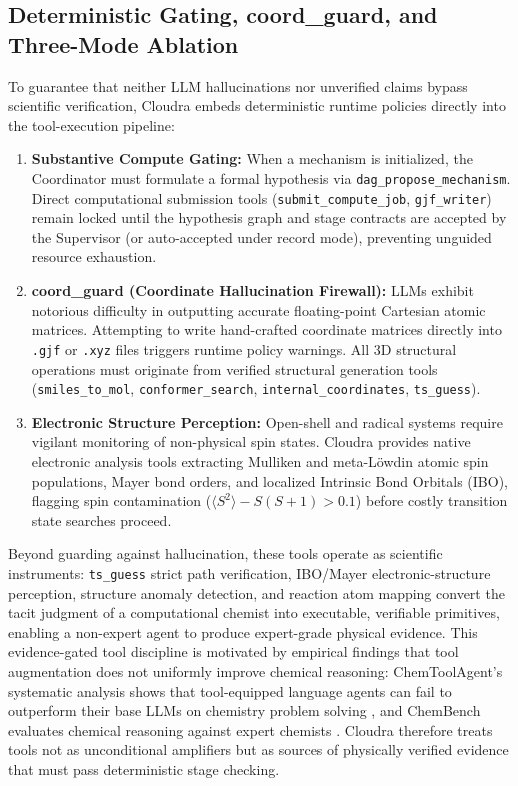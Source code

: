 \documentclass[10pt,twocolumn,letterpaper]{article}
\begin{document}
\subsection{Deterministic Gating, coord\_guard, and Three-Mode Ablation}
To guarantee that neither LLM hallucinations nor unverified claims bypass scientific verification, Cloudra embeds deterministic runtime policies directly into the tool-execution pipeline:
\begin{enumerate}[leftmargin=*]
\item \textbf{Substantive Compute Gating:} When a mechanism is initialized, the Coordinator must formulate a formal hypothesis via \texttt{dag\_propose\_mechanism}. Direct computational submission tools (\texttt{submit\_compute\_job}, \texttt{gjf\_writer}) remain locked until the hypothesis graph and stage contracts are accepted by the Supervisor (or auto-accepted under record mode), preventing unguided resource exhaustion.
\item \textbf{coord\_guard (Coordinate Hallucination Firewall):} LLMs exhibit notorious difficulty in outputting accurate floating-point Cartesian atomic matrices. Attempting to write hand-crafted coordinate matrices directly into \texttt{.gjf} or \texttt{.xyz} files triggers runtime policy warnings. All 3D structural operations must originate from verified structural generation tools (\texttt{smiles\_to\_mol}, \texttt{conformer\_search}, \texttt{internal\_coordinates}, \texttt{ts\_guess}).
\item \textbf{Electronic Structure Perception:} Open-shell and radical systems require vigilant monitoring of non-physical spin states. Cloudra provides native electronic analysis tools extracting Mulliken and meta-Löwdin atomic spin populations, Mayer bond orders, and localized Intrinsic Bond Orbitals (IBO), flagging spin contamination ($\langle S^2 \rangle - S(S+1) > 0.1$) before costly transition state searches proceed.
\end{enumerate}

Beyond guarding against hallucination, these tools operate as scientific instruments: \texttt{ts\_guess} strict path verification, IBO/Mayer electronic-structure perception, structure anomaly detection, and reaction atom mapping convert the tacit judgment of a computational chemist into executable, verifiable primitives, enabling a non-expert agent to produce expert-grade physical evidence. This evidence-gated tool discipline is motivated by empirical findings that tool augmentation does not uniformly improve chemical reasoning: ChemToolAgent's systematic analysis shows that tool-equipped language agents can fail to outperform their base LLMs on chemistry problem solving \cite{yu2025chemtoolagent}, and ChemBench evaluates chemical reasoning against expert chemists \cite{mirza2025chembench}. Cloudra therefore treats tools not as unconditional amplifiers but as sources of physically verified evidence that must pass deterministic stage checking.
\end{document}

